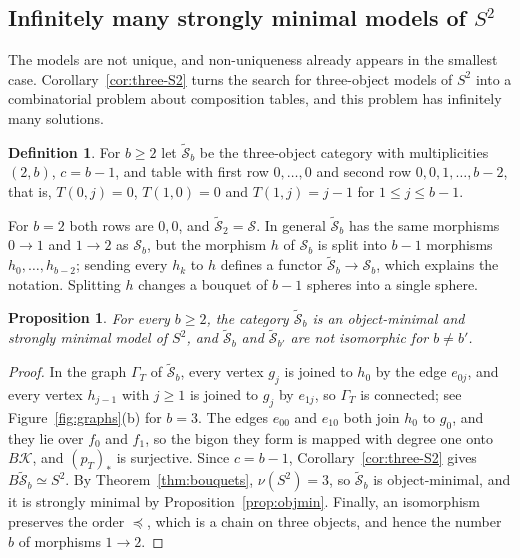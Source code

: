 \documentclass[12pt]{amsart}
\newtheorem{proposition}[teo]{Proposition}
\theoremstyle{definition}
\newtheorem{definition}[teo]{Definition}
\theoremstyle{remark}
\newcommand{\K}{\mathcal{K}}
\newcommand{\Sph}{\mathcal{S}}
\newcommand{\tSph}{\widetilde{\mathcal{S}}}
\begin{document}
\subsection{Infinitely many strongly minimal models of \texorpdfstring{$S^2$}{S2}}\label{sec:S2}

The models are not unique, and non-uniqueness already appears in the smallest case. Corollary~\ref{cor:three-S2} turns the search for three-object models of $S^2$ into a combinatorial problem about composition tables, and this problem has infinitely many solutions.

\begin{definition}\label{def:Lambda}
For $b\ge2$ let $\tSph_b$ be the three-object category with multiplicities $(2,b)$, $c=b-1$, and table with first row $0,\dots,0$ and second row $0,0,1,\dots,b-2$, that is, $T(0,j)=0$, $T(1,0)=0$ and $T(1,j)=j-1$ for $1\le j\le b-1$.
\end{definition}

For $b=2$ both rows are $0,0$, and $\tSph_2=\Sph$. In general $\tSph_b$ has the same morphisms $0\to1$ and $1\to2$ as $\Sph_b$, but the morphism $h$ of $\Sph_b$ is split into $b-1$ morphisms $h_0,\dots,h_{b-2}$; sending every $h_k$ to $h$ defines a functor $\tSph_b\to\Sph_b$, which explains the notation. Splitting $h$ changes a bouquet of $b-1$ spheres into a single sphere.

\begin{proposition}\label{prop:Lambda}
For every $b\ge2$, the category $\tSph_b$ is an object-minimal and strongly minimal model of $S^2$, and $\tSph_b$ and $\tSph_{b'}$ are not isomorphic for $b\neq b'$.
\end{proposition}

\begin{proof}
In the graph $\Gamma_T$ of $\tSph_b$, every vertex $g_j$ is joined to $h_0$ by the edge $e_{0j}$, and every vertex $h_{j-1}$ with $j\ge1$ is joined to $g_j$ by $e_{1j}$, so $\Gamma_T$ is connected; see Figure~\ref{fig:graphs}(b) for $b=3$. The edges $e_{00}$ and $e_{10}$ both join $h_0$ to $g_0$, and they lie over $f_0$ and $f_1$, so the bigon they form is mapped with degree one onto $B\K$, and $(p_T)_*$ is surjective. Since $c=b-1$, Corollary~\ref{cor:three-S2} gives $B\tSph_b\simeq S^2$. By Theorem~\ref{thm:bouquets}, $\nu(S^2)=3$, so $\tSph_b$ is object-minimal, and it is strongly minimal by Proposition~\ref{prop:objmin}. Finally, an isomorphism preserves the order $\preceq$, which is a chain on three objects, and hence the number $b$ of morphisms $1\to2$.
\end{proof}
\end{document}
